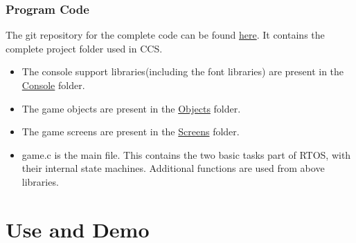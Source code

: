 \documentclass[a4paper,12pt,oneside]{book}
\begin{document}
\subsection{Program Code}
\qquad The git repository for the complete code can be found \href{https://github.com/eYSIP-2017/eYSIP-2017_Game_Development-TI-RTOS/tree/master/Breakout_Final}{here}. It contains the complete project folder used in CCS. 
\begin{itemize}
  \item The console support libraries(including the font libraries) are present in the \href{https://github.com/eYSIP-2017/eYSIP-2017_Game_Development-TI-RTOS/tree/master/Breakout_Final/Console}{Console} folder. 
  \item The game objects are present in the \href{https://github.com/eYSIP-2017/eYSIP-2017_Game_Development-TI-RTOS/tree/master/Breakout_Final/Objects}{Objects} folder.
    \item The game screens are present in the \href{https://github.com/eYSIP-2017/eYSIP-2017_Game_Development-TI-RTOS/tree/master/Breakout_Final/Screens}{Screens} folder.
  \item game.c is the main file. This contains the two basic tasks part of RTOS, with their internal state machines. Additional functions are used from above libraries.
\end{itemize}
\chapter{Use and Demo}
\end{document}
